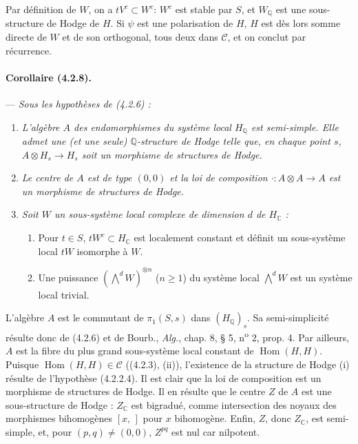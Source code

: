 \documentclass[10pt]{article}
\newcommand{\C}{\mathbb C}
\newcommand{\Q}{\mathbb Q}
\newcommand{\Hom}{\operatorname{Hom}}
\begin{document}
Par définition de $W$, on a $tV^c\subset W^c$: $W^c$ est stable par $S$, et $W_\Q$ est une sous-structure de Hodge de $H$. Si $\psi$ est une polarisation de $H$, $H$ est dès lors somme directe de $W$ et de son orthogonal, tous deux dans $\mathcal C$, et on conclut par récurrence.

\paragraph{Corollaire (4.2.8).} --- {\itshape Sous les hypothèses de (4.2.6) :}
\begin{enumerate}[label=(\roman*)]
\item {\itshape L'algèbre $A$ des endomorphismes du système local $H_\Q$ est semi-simple. Elle admet une (et une seule) $\Q$-structure de Hodge telle que, en chaque point $s$, $A\otimes H_s\to H_s$ soit un morphisme de structures de Hodge.}
\item {\itshape Le centre de $A$ est de type $(0,0)$ et la loi de composition $\cdot : A\otimes A\to A$ est un morphisme de structures de Hodge.}
\item {\itshape Soit $W$ un sous-système local complexe de dimension $d$ de $H_\C$ :
\begin{enumerate}[label=\alph*)]
\item Pour $t\in S$, $tW^c\subset H_\C$ est localement constant et définit un sous-système local $tW$ isomorphe à $W$.
\item Une puissance $(\bigwedge^dW)^{\otimes n}$ ($n\ge1$) du système local $\bigwedge^dW$ est un système local trivial.
\end{enumerate}}
\end{enumerate}

L'algèbre $A$ est le commutant de $\pi_1(S,s)$ dans $(H_\Q)_s$. Sa semi-simplicité résulte donc de (4.2.6) et de Bourb., \textit{Alg.}, chap. 8, § 5, n\textsuperscript{o} 2, prop. 4. Par ailleurs, $A$ est la fibre du plus grand sous-système local constant de $\Hom(H,H)$. Puisque $\Hom(H,H)\in\mathcal C$ ((4.2.3), (ii)), l'existence de la structure de Hodge (i) résulte de l'hypothèse (4.2.2.4). Il est clair que la loi de composition est un morphisme de structures de Hodge. Il en résulte que le centre $Z$ de $A$ est une sous-structure de Hodge : $Z_\C$ est bigradué, comme intersection des noyaux des morphismes bihomogènes $[x,\,]$ pour $x$ bihomogène. Enfin, $Z$, donc $Z_\C$, est semi-simple, et, pour $(p,q)\ne(0,0)$, $Z^{pq}$ est nul car nilpotent.
\end{document}
